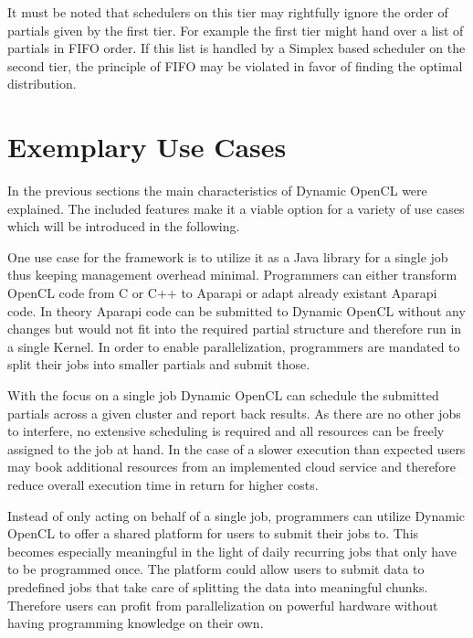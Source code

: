 It must be noted that schedulers on this tier may rightfully ignore the order of partials given by the first tier. For example the first tier might hand over a list of partials in FIFO order. If this list is handled by a Simplex based scheduler on the second tier, the principle of FIFO may be violated in favor of finding the optimal distribution.

\section{Exemplary Use Cases}
\label{use_cases}
In the previous sections the main characteristics of Dynamic OpenCL were explained. The included features make it a viable option for a variety of use cases which will be introduced in the following.

\begin{description}[style=nextline]
	\item[Job Based Library]
	One use case for the framework is to utilize it as a Java library for a single job thus keeping management overhead minimal. Programmers can either transform OpenCL code from C or C++ to Aparapi or adapt already existant Aparapi code. In theory Aparapi code can be submitted to Dynamic OpenCL without any changes but would not fit into the required partial structure and therefore run in a single Kernel. In order to enable parallelization, programmers are mandated to split their jobs into smaller partials and submit those.
	
	With the focus on a single job Dynamic OpenCL can schedule the submitted partials across a given cluster and report back results. As there are no other jobs to interfere, no extensive scheduling is required and all resources can be freely assigned to the job at hand. In the case of a slower execution than expected users may book additional resources from an implemented cloud service and therefore reduce overall execution time in return for higher costs.
	
	\item[Local Cluster Provider] 
	
	Instead of only acting on behalf of a single job, programmers can utilize Dynamic OpenCL to offer a shared platform for users to submit their jobs to. This becomes especially meaningful in the light of daily recurring jobs that only have to be programmed once. The platform could allow users to submit data to predefined jobs that take care of splitting the data into meaningful chunks. Therefore users can profit from parallelization on powerful hardware without having programming knowledge on their own.
	

\end{description}
